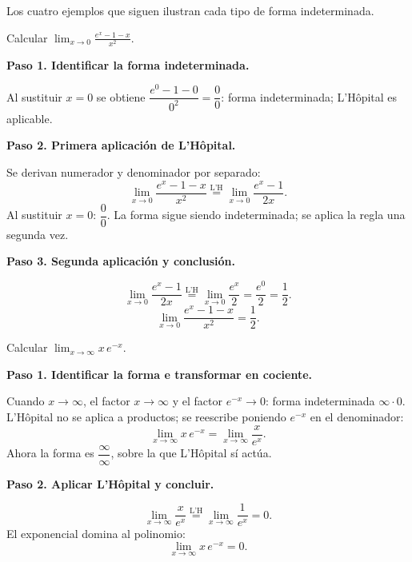 Los cuatro ejemplos que siguen ilustran cada tipo de forma indeterminada.

\begin{example}
Calcular $\displaystyle\lim_{x\to 0}\frac{e^x-1-x}{x^2}$.
\begin{myproof}
\textbf{Paso 1. Identificar la forma indeterminada.}

Al sustituir $x=0$ se obtiene $\dfrac{e^0-1-0}{0^2}=\dfrac{0}{0}$:
forma indeterminada; L'Hôpital es aplicable.

\textbf{Paso 2. Primera aplicación de L'Hôpital.}

Se derivan numerador y denominador por separado:
\[
\lim_{x\to 0}\frac{e^x-1-x}{x^2}
\overset{\text{L'H}}{=}
\lim_{x\to 0}\frac{e^x-1}{2x}.
\]
Al sustituir $x=0$: $\dfrac{0}{0}$. La forma sigue siendo indeterminada;
se aplica la regla una segunda vez.

\textbf{Paso 3. Segunda aplicación y conclusión.}

\[
\lim_{x\to 0}\frac{e^x-1}{2x}
\overset{\text{L'H}}{=}
\lim_{x\to 0}\frac{e^x}{2}
= \frac{e^0}{2} = \frac{1}{2}.
\]
\[
\boxed{\lim_{x\to 0}\frac{e^x-1-x}{x^2} = \frac{1}{2}.}
\]
\end{myproof}
\end{example}

\begin{example}
Calcular $\displaystyle\lim_{x\to\infty}x\,e^{-x}$.
\begin{myproof}
\textbf{Paso 1. Identificar la forma e transformar en cociente.}

Cuando $x\to\infty$, el factor $x\to\infty$ y el factor $e^{-x}\to 0$:
forma indeterminada $\infty\cdot 0$. L'Hôpital no se aplica a productos;
se reescribe poniendo $e^{-x}$ en el denominador:
\[
\lim_{x\to\infty} x\,e^{-x}
= \lim_{x\to\infty}\frac{x}{e^{x}}.
\]
Ahora la forma es $\dfrac{\infty}{\infty}$, sobre la que L'Hôpital sí actúa.

\textbf{Paso 2. Aplicar L'Hôpital y concluir.}

\[
\lim_{x\to\infty}\frac{x}{e^{x}}
\overset{\text{L'H}}{=}
\lim_{x\to\infty}\frac{1}{e^{x}} = 0.
\]
El exponencial domina al polinomio:
\[
\boxed{\lim_{x\to\infty}x\,e^{-x} = 0.}
\]
\end{myproof}
\end{example}

